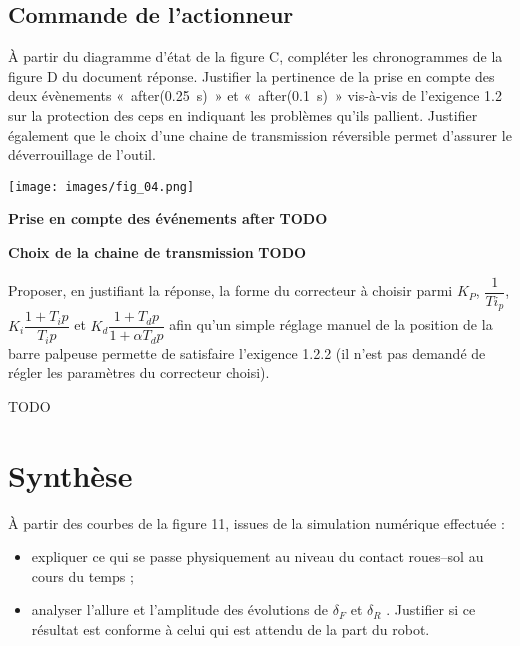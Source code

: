 \documentclass[11pt]{article}
\begin{document}
\subsection{Commande de l’actionneur}

\UPSTIquestion  À partir du diagramme d’état de la figure C, compléter les chronogrammes de la figure D du document réponse. Justifier la pertinence de la prise en compte des deux évènements «~after(\SI{0,25}{s})~» et «~after(\SI{0,1}{s})~» vis-à-vis de l’exigence 1.2 sur la protection des ceps en indiquant les problèmes qu’ils pallient. Justifier également que le choix d’une chaine de transmission réversible permet d’assurer le déverrouillage de l’outil.

\begin{UPSTIcorrige}
\begin{center}
\texttt{[image: images/fig\_04.png]}
\end{center}

\textbf{Prise en compte des événements after}
\textbf{TODO}

\textbf{Choix de la chaine de transmission}
\textbf{TODO}


\end{UPSTIcorrige}





\UPSTIquestion  Proposer, en justifiant la réponse, la forme du correcteur à choisir parmi $K_P$, $\dfrac{1}{Ti_p}$, $K_i \dfrac{1+T_i p}{T_i p}$ et $K_d \dfrac{1+T_d p}{1+\alpha T_d p}$ afin qu’un simple réglage manuel de la position de la barre palpeuse permette de satisfaire l’exigence 1.2.2 (il n’est pas demandé de régler les paramètres du correcteur choisi).
\begin{UPSTIcorrige}
TODO
\end{UPSTIcorrige}



\section{Synthèse}


\UPSTIquestion  À partir des courbes de la figure 11, issues de la simulation numérique effectuée :
\begin{itemize}
\item expliquer ce qui se passe physiquement au niveau du contact roues–sol au cours du temps ;
\item analyser l’allure et l’amplitude des évolutions de $\delta_F$ et $\delta_R$ . Justifier si ce résultat est conforme à celui qui est attendu de la part du robot.
\end{itemize}
\end{document}
